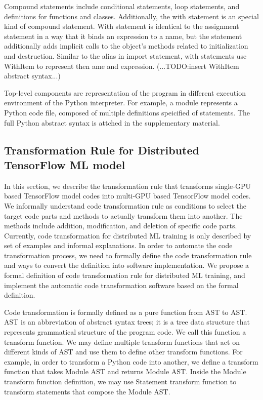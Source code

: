 Compound statements include conditional statements, loop statements,
and definitions for functions and classes.
Additionally, the with statement is an special kind of compound statement.
With statement is identical to the assignment statement 
in a way that it binds an expression to a name, 
but the statement additionally adds implicit calls
to the object's methods related to initialization and destruction.
Similar to the alias in import statement,
with statements use WithItem to represent then ame and expression.
(...TODO:insert WithItem abstract syntax...) 

Top-level components are representation of the program
in different execution environment of the Python interpreter.
For example, a module represents a Python code file, composed of
multiple definitions speicified of statements. 
The full Python abstract syntax is attched in the supplementary material.

\subsection{Transformation Rule for Distributed TensorFlow ML model}


In this section, we describe the transformation rule that
transforms single-GPU based TensorFlow model codes into
multi-GPU based TensorFlow model codes.
We informally understand code transformation rule as
conditions to select the target code parts
and methods to actually transform them into another.
The methods include addition, modification, and deletion of
specific code parts.
Currently, code transformation for distributed ML training
is only described by set of examples and informal explanations.
In order to automate the code transformation process,
we need to formally define the code transformation rule
and ways to convert the definition into software implementation.
We propose a formal definition of code transformation rule
for distributed ML training, and implement the automatic code transformation
software based on the formal definition.

Code transformation is formally defined as a pure function from AST to AST.
AST is an abbreviation of abstract syntax trees; it is a tree data structure
that represents grammatical structure of the program code.
We call this function a transform function.
We may define multiple transform functions that act on different kinds
of AST and use them to define other transform functions.
For example, in order to transform a Python code into another,
we define a transform function that takes Module AST and returns Module AST.
Inside the Module transform function definition,
we may use Statement transform function to transform statements
that compose the Module AST.

